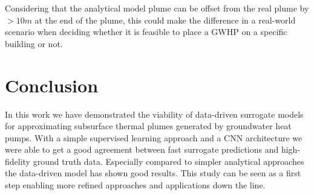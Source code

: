 \documentclass{article} %
\begin{document}
Considering that the analytical model plume can be offset from the real plume by $> 10m$ at the end of the plume, this could make the difference in a real-world scenario when deciding whether it is feasible to place a GWHP on a specific building or not.





\section{Conclusion}
\label{sec:conclusion}

In this work we have demonstrated the viability of data-driven surrogate models for approximating subsurface thermal plumes generated by groundwater heat pumps.
With a simple supervised learning approach and a CNN architecture we were able to get a good agreement between fast surrogate predictions and high-fidelity ground truth data.
Especially compared to simpler analytical approaches the data-driven model has shown good results.
This study can be seen as a first step enabling more refined approaches and applications down the line.
\end{document}
